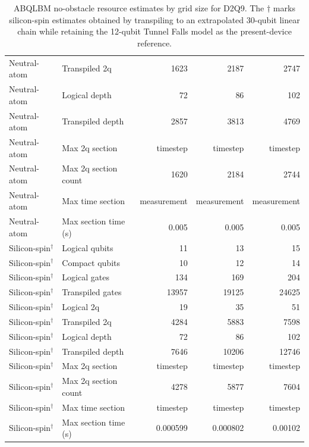 \begin{table}
\begin{tabular}{llrrr}
Neutral-atom & Transpiled 2q & 1623 & 2187 & 2747 \\
Neutral-atom & Logical depth & 72 & 86 & 102 \\
Neutral-atom & Transpiled depth & 2857 & 3813 & 4769 \\
Neutral-atom & Max 2q section & timestep & timestep & timestep \\
Neutral-atom & Max 2q section count & 1620 & 2184 & 2744 \\
Neutral-atom & Max time section & measurement & measurement & measurement \\
Neutral-atom & Max section time (s) & 0.005 & 0.005 & 0.005 \\
\hline
Silicon-spin$^{\dagger}$ & Logical qubits & 11 & 13 & 15 \\
Silicon-spin$^{\dagger}$ & Compact qubits & 10 & 12 & 14 \\
Silicon-spin$^{\dagger}$ & Logical gates & 134 & 169 & 204 \\
Silicon-spin$^{\dagger}$ & Transpiled gates & 13957 & 19125 & 24625 \\
Silicon-spin$^{\dagger}$ & Logical 2q & 19 & 35 & 51 \\
Silicon-spin$^{\dagger}$ & Transpiled 2q & 4284 & 5883 & 7598 \\
Silicon-spin$^{\dagger}$ & Logical depth & 72 & 86 & 102 \\
Silicon-spin$^{\dagger}$ & Transpiled depth & 7646 & 10206 & 12746 \\
Silicon-spin$^{\dagger}$ & Max 2q section & timestep & timestep & timestep \\
Silicon-spin$^{\dagger}$ & Max 2q section count & 4278 & 5877 & 7604 \\
Silicon-spin$^{\dagger}$ & Max time section & timestep & timestep & timestep \\
Silicon-spin$^{\dagger}$ & Max section time (s) & 0.000599 & 0.000802 & 0.00102 \\
\hline
\end{tabular}
\caption{ABQLBM no-obstacle resource estimates by grid size for D2Q9. The \(\dagger\) marks silicon-spin estimates obtained by transpiling to an extrapolated 30-qubit linear chain while retaining the 12-qubit Tunnel Falls model as the present-device reference.}
\label{tab:abqlbm-grid-resources}
\end{table}
